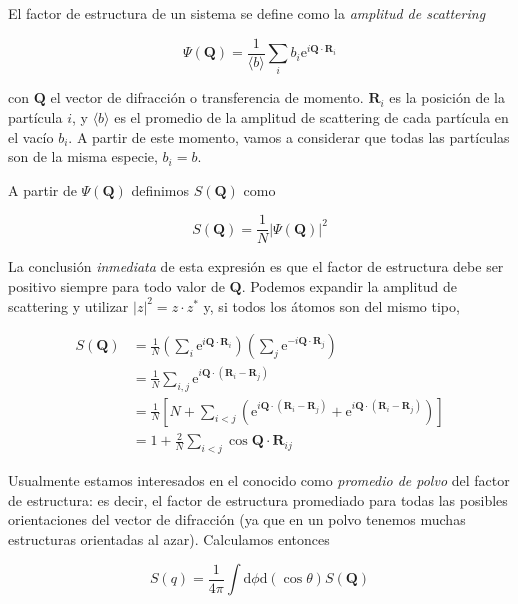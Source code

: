 El factor de estructura de un sistema se define como la \emph{amplitud de scattering}~\cite{egami_underneath_2003}

\begin{equation}
  \Psi(\mathbf{Q}) = \frac{1}{\langle b\rangle} \sum_i b_i
  \text{e}^{i\mathbf{Q}\cdot\mathbf{R}_i}
  \label{eq:scat_amp}
\end{equation}

con $\mathbf{Q}$ el vector de difracción o transferencia de momento.
$\mathbf{R}_i$ es la posición de la partícula $i$, y $\langle b\rangle$ es el promedio de la amplitud de scattering de cada partícula en el vacío $b_i$.
A partir de este momento, vamos a considerar que todas las partículas son de la misma especie, $b_i = b$.

A partir de $\Psi(\mathbf{Q})$ definimos $S(\mathbf{Q})$ como

\begin{equation*}
  S(\mathbf{Q}) = \frac{1}{N} |\Psi(\mathbf{Q})|^2
\end{equation*}

La conclusión \emph{inmediata} de esta expresión es que el factor de estructura debe ser positivo siempre para todo valor de $\mathbf{Q}$.
Podemos expandir la amplitud de scattering y utilizar $|z|^2 = z\cdot z^*$  y, si todos los átomos son del mismo tipo,


\begin{align*}
  S(\mathbf{Q}) &= \frac{1}{N} \left( \sum_i \text{e}^{i\mathbf{Q}\cdot\mathbf{R}_i} \right)
  \left( \sum_j \text{e}^{-i\mathbf{Q}\cdot\mathbf{R}_j} \right)\\
  &= \frac{1}{N} \sum_{i, j} \text{e}^{i\mathbf{Q}\cdot(\mathbf{R}_i-\mathbf{R}_j)}\\
  &= \frac{1}{N} \left[N + \sum_{i < j}
    \left(\text{e}^{i\mathbf{Q}\cdot(\mathbf{R}_i-\mathbf{R}_j)} +
      \text{e}^{i\mathbf{Q}\cdot(\mathbf{R}_i-\mathbf{R}_j)}\right)\right]\\
  &= 1 + \frac{2}{N}\sum_{i < j}\cos{\mathbf{Q}\cdot\mathbf{R}_{ij}}
\end{align*}

Usualmente estamos interesados en el conocido como \emph{promedio de polvo} del factor de estructura: es decir, el factor de estructura promediado para todas las posibles orientaciones del vector de difracción (ya que en un polvo tenemos muchas estructuras orientadas al azar).
Calculamos entonces

\begin{equation*}
  S(q) = \frac{1}{4\pi}\int\text{d}\phi\text{d}(\cos\theta) S(\mathbf{Q})
\end{equation*}


